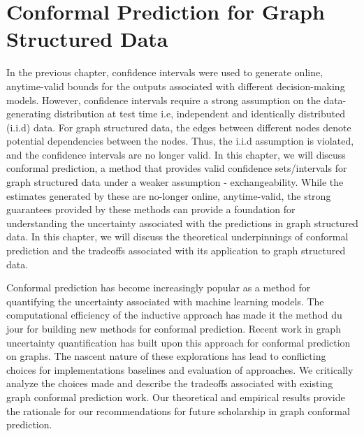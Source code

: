 \chapter{Conformal Prediction for Graph Structured Data}
\label{chp:graphConformal}
In the previous chapter, confidence intervals were used to generate online, anytime-valid bounds for the outputs associated with different decision-making models.
However, confidence intervals require a strong assumption on the data-generating distribution at test time i.e, independent and identically distributed (i.i.d) data.
For graph structured data, the edges between different nodes denote potential dependencies between the nodes.
Thus, the i.i.d assumption is violated, and the confidence intervals are no longer valid.
In this chapter, we will discuss conformal prediction, a method that provides valid confidence sets/intervals for graph structured data under a weaker assumption - exchangeability.
While the estimates generated by these are no-longer online, anytime-valid, the strong guarantees provided by these methods can provide a foundation for understanding the uncertainty associated with the predictions in graph structured data.
In this chapter, we will discuss the theoretical underpinnings of conformal prediction and the tradeoffs associated with its application to graph structured data.


Conformal prediction has become increasingly popular as a method for quantifying the uncertainty associated with machine learning models. 
The computational efficiency of the inductive approach has made it the method du jour for building new methods for conformal prediction.
Recent work in graph uncertainty quantification has built upon this approach for conformal prediction on graphs.
The nascent nature of these explorations has lead to conflicting choices for implementations baselines and evaluation of approaches.
We critically analyze the choices made and describe the tradeoffs associated with existing graph conformal prediction work. 
Our theoretical and empirical results provide the rationale for our recommendations for future scholarship in graph conformal prediction.

